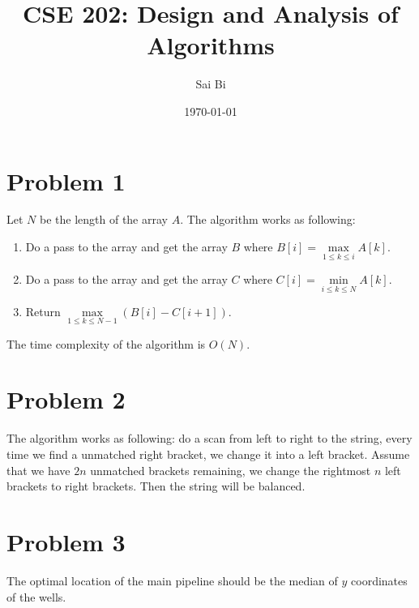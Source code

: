 \documentclass[a4paper,11pt]{article}
\theoremstyle{mytheor}
\begin{document}
\title{CSE 202: Design and Analysis of Algorithms}

\author{Sai Bi}

\date{\today}

\maketitle

\section*{Problem 1}
Let $N$ be the length of the array $A$. The algorithm works as following:
\begin{enumerate}
\item
Do a pass to the array and get the array $B$ where $B[i]=\max\limits_{1\leq k \leq i} A[k]$.
\item 
Do a pass to the array and get the array $C$ where $C[i]=\min\limits_{i\leq k \leq N} A[k]$.
\item
Return $\max\limits_{1\leq k \leq N-1} (B[i] - C[i+1])$.
\end{enumerate}
The time complexity of the algorithm is $O(N)$.

\section*{Problem 2}
The algorithm works as following: do a scan from left to right to the string, every time we find
a unmatched right bracket, we change it into a left bracket. Assume that we have $2n$ unmatched 
brackets remaining, we change the rightmost $n$ left brackets to right brackets. Then the string
will be balanced.

\section*{Problem 3}
The optimal location of the main pipeline should be the median of $y$ coordinates of the wells.
\end{document}
